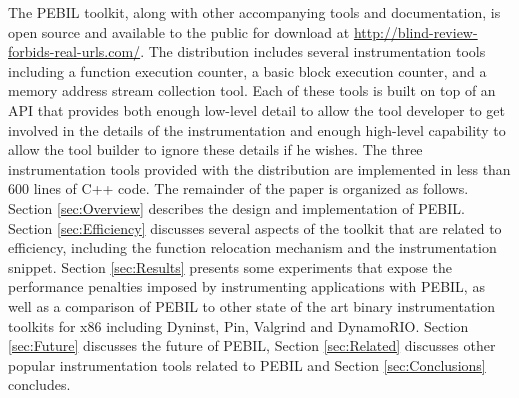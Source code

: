 The PEBIL toolkit, along with other accompanying tools and documentation, is
open source and available to the public for download at
\url{http://blind-review-forbids-real-urls.com/}. The distribution includes
several instrumentation tools including a function execution counter, a basic
block execution counter, and a memory address stream collection tool. Each of
these tools is built on top of an API that provides both enough low-level detail
to allow the tool developer to get involved in the details of the
instrumentation and enough high-level capability to allow the tool builder to
ignore these details if he wishes. The three instrumentation tools provided with
the distribution are implemented in less than 600 lines of C++ code. The
remainder of the paper is organized as follows. Section \ref{sec:Overview}
describes the design and implementation of PEBIL. Section \ref{sec:Efficiency}
discusses several aspects of the toolkit that are related to efficiency,
including the function relocation mechanism and the instrumentation snippet.
Section \ref{sec:Results} presents some experiments that expose the performance
penalties imposed by instrumenting applications with PEBIL, as well as a
comparison of PEBIL to other state of the art binary instrumentation toolkits
for x86 including Dyninst, Pin, Valgrind and DynamoRIO. Section \ref{sec:Future}
discusses the future of PEBIL, Section \ref{sec:Related} discusses other popular
instrumentation tools related to PEBIL and Section \ref{sec:Conclusions}
concludes.
